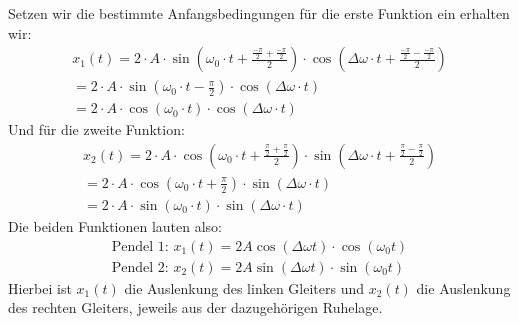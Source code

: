 \documentclass{article}
\begin{document}
                  Setzen wir die bestimmte Anfangsbedingungen für die erste Funktion ein erhalten wir:
                  \begin{equation} %
                      \begin{gathered}
                          x_1(t) = 2 \cdot A \cdot \sin \left( \omega_0 \cdot t + \frac{ \frac{-\pi}{2} + \frac{-\pi}{2}}{2} \right) \cdot \cos \left( \Delta \omega \cdot t + \frac{ \frac{- \pi}{2} - \frac{- \pi}{2} }{2} \right) \\
                          = 2 \cdot A \cdot \sin \left( \omega_0 \cdot t - \frac{\pi}{2} \right) \cdot \cos \left( \Delta \omega \cdot t \right) \\
                          = 2 \cdot A \cdot \cos \left( \omega_0 \cdot t \right) \cdot \cos \left( \Delta \omega \cdot t \right)
                      \end{gathered}
                  \end{equation} %
                  Und für die zweite Funktion:
                  \begin{equation}
                      \begin{gathered}
                          x_2(t) = 2 \cdot A \cdot \cos\left( \omega_0 \cdot t + \frac{ \frac{\pi}{2} + \frac{\pi}{2} }{2} \right) \cdot \sin\left( \Delta \omega \cdot t + \frac{ \frac{\pi}{2} - \frac{\pi}{2} }{2} \right) \\
                          = 2 \cdot A \cdot \cos\left( \omega_0 \cdot t + \frac{\pi}{2} \right) \cdot \sin\left( \Delta \omega \cdot t \right) \\
                          = 2 \cdot A \cdot \sin \left( \omega_0 \cdot t \right) \cdot \sin\left( \Delta \omega \cdot t \right)
                      \end{gathered}
                  \end{equation}
                  Die beiden Funktionen lauten also:
                  \begin{equation}
                      \begin{gathered}\label{eq:bewegungsfunktionen}
                          \text{Pendel 1: } x_1(t) = 2 A \cos( \Delta \omega t ) \cdot \cos( \omega_0 t) \\
                          \text{Pendel 2: } x_2(t) = 2 A \sin( \Delta \omega t ) \cdot \sin( \omega_0 t)
                      \end{gathered}
                  \end{equation}
                  Hierbei ist \(x_1(t)\) die Auslenkung des linken Gleiters und \(x_2(t)\) die Auslenkung des rechten Gleiters, jeweils aus der dazugehörigen Ruhelage. \\
\end{document}
